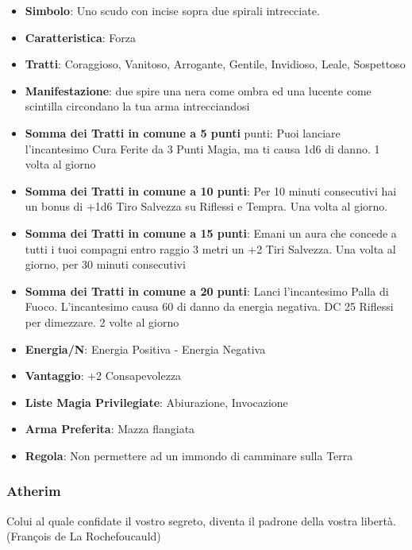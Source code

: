 \begin{multicols}{2}
\begin{itemize}[leftmargin=*] \setlength{\itemsep}{0pt}
\item \textbf{Simbolo}: Uno scudo con incise sopra due spirali intrecciate.
\item \textbf{Caratteristica}: Forza
\item \textbf{Tratti}: Coraggioso, Vanitoso, Arrogante, Gentile, Invidioso, Leale, Sospettoso
\item \textbf{Manifestazione}: due spire una nera come ombra ed una lucente come scintilla circondano la tua arma intrecciandosi
\item \textbf{Somma dei Tratti in comune a 5 punti} punti: Puoi lanciare l'incantesimo Cura Ferite da 3 Punti Magia, ma ti causa 1d6 di danno. 1 volta al giorno
\item \textbf{Somma dei Tratti in comune a 10 punti}: Per 10 minuti consecutivi hai un bonus di +1d6 Tiro Salvezza su Riflessi e Tempra. Una volta al giorno.
\item \textbf{Somma dei Tratti in comune a 15 punti}: Emani un aura che concede a tutti i tuoi compagni entro raggio 3 metri un +2 Tiri Salvezza. Una volta al giorno, per 30 minuti consecutivi
\item \textbf{Somma dei Tratti in comune a 20 punti}: Lanci l'incantesimo Palla di Fuoco. L'incantesimo causa 60 di danno da energia negativa. DC 25 Riflessi per dimezzare. 2 volte al giorno
\item \textbf{Energia/N}: Energia Positiva - Energia Negativa
\item \textbf{Vantaggio}: +2 Consapevolezza
\item \textbf{Liste Magia Privilegiate}: Abiurazione, Invocazione
\item \textbf{Arma Preferita}: Mazza flangiata
\item \textbf{Regola}: Non permettere ad un immondo di camminare sulla Terra
\end{itemize}

\subsubsection{Atherim}\label{atherim}\hypertarget{atherim}{}

\begin{changemargin}{0.3cm}{0.3cm}\begin{enfasi}{
Colui al quale confidate il vostro segreto, diventa il padrone della vostra libertà. (François de La Rochefoucauld)

}
\end{enfasi}
\end{changemargin}
\end{multicols}

